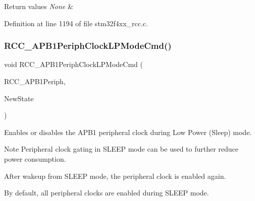 \begin{DoxyRetVals}{Return values}
{\em None} & \\
\hline
\end{DoxyRetVals}


Definition at line 1194 of file stm32f4xx\+\_\+rcc.\+c.

\mbox{\label{group___r_c_c___group3_ga84dd64badb84768cbcf19e241cadff50}} 
\subsubsection{\texorpdfstring{R\+C\+C\+\_\+\+A\+P\+B1\+Periph\+Clock\+L\+P\+Mode\+Cmd()}{RCC\_APB1PeriphClockLPModeCmd()}}
{\footnotesize\ttfamily void R\+C\+C\+\_\+\+A\+P\+B1\+Periph\+Clock\+L\+P\+Mode\+Cmd (\begin{DoxyParamCaption}\item[{uint32\+\_\+t}]{R\+C\+C\+\_\+\+A\+P\+B1\+Periph,  }\item[{Functional\+State}]{New\+State }\end{DoxyParamCaption})}



Enables or disables the A\+P\+B1 peripheral clock during Low Power (Sleep) mode. 

\begin{DoxyNote}{Note}
Peripheral clock gating in S\+L\+E\+EP mode can be used to further reduce power consumption. 

After wakeup from S\+L\+E\+EP mode, the peripheral clock is enabled again. 

By default, all peripheral clocks are enabled during S\+L\+E\+EP mode. 
\end{DoxyNote}

